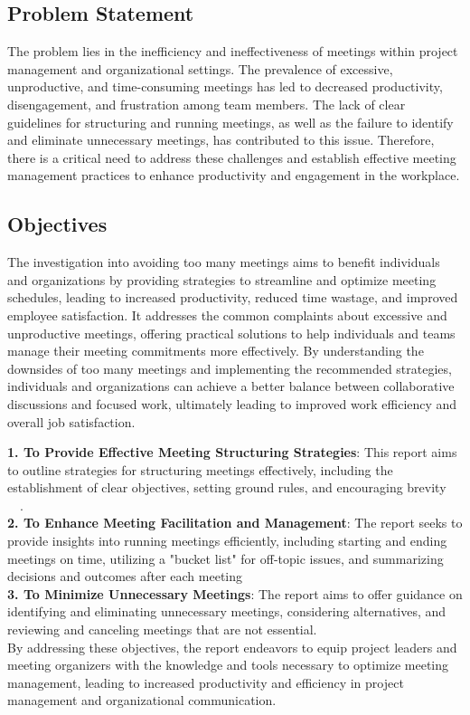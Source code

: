 \subsection{Problem Statement}
The problem lies in the inefficiency and ineffectiveness of meetings within project management and organizational settings. The prevalence of excessive, unproductive, and time-consuming meetings has led to decreased productivity, disengagement, and frustration among team members. The lack of clear guidelines for structuring and running meetings, as well as the failure to identify and eliminate unnecessary meetings, has contributed to this issue. Therefore, there is a critical need to address these challenges and establish effective meeting management practices to enhance productivity and engagement in the workplace.
\subsection{Objectives}
The investigation into avoiding too many meetings aims to benefit individuals and organizations by providing strategies to streamline and optimize meeting schedules, leading to increased productivity, reduced time wastage, and improved employee satisfaction. It addresses the common complaints about excessive and unproductive meetings, offering practical solutions to help individuals and teams manage their meeting commitments more effectively. By understanding the downsides of too many meetings and implementing the recommended strategies, individuals and organizations can achieve a better balance between collaborative discussions and focused work, ultimately leading to improved work efficiency and overall job satisfaction.

{\bf 1. To Provide Effective Meeting Structuring Strategies}: This report aims to outline strategies for structuring meetings effectively, including the establishment of clear objectives, setting ground rules, and encouraging brevity ~\cite{03}~\cite{04}.\\
{\bf 2. To Enhance Meeting Facilitation and Management}: The report seeks to provide insights into running meetings efficiently, including starting and ending meetings on time, utilizing a "bucket list" for off-topic issues, and summarizing decisions and outcomes after each meeting ~\cite{05}\\
{\bf 3. To Minimize Unnecessary Meetings}: The report aims to offer guidance on identifying and eliminating unnecessary meetings, considering alternatives, and reviewing and canceling meetings that are not essential.\\
By addressing these objectives, the report endeavors to equip project leaders and meeting organizers with the knowledge and tools necessary to optimize meeting management, leading to increased productivity and efficiency in project management and organizational communication.
\\

